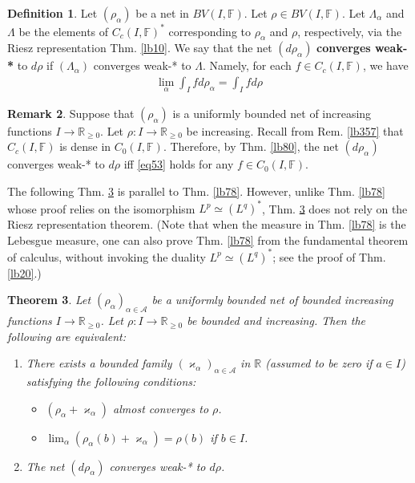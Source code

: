 \documentclass[12pt,b5paper,notitlepage]{article}
\theoremstyle{definition}
\newtheorem{df}{Definition}[subsection]
\newtheorem{rem}[df]{Remark}
\theoremstyle{plain}
\newtheorem{thm}[df]{Theorem}
\newcommand{\scr}{\mathscr}
\newcommand{\Rbb}{\mathbb R}
\newcommand{\Fbb}{\mathbb F}
\numberwithin{equation}{section}
\begin{document}
\begin{df}
Let $(\rho_\alpha)$ be a net in $BV(I,\Fbb)$. Let $\rho\in BV(I,\Fbb)$. Let $\Lambda_\alpha$ and $\Lambda$ be the elements of $C_c(I,\Fbb)^*$ corresponding to $\rho_\alpha$ and $\rho$, respectively, via the Riesz representation Thm. \ref{lb10}.  We say that the net $(d\rho_\alpha)$ \textbf{converges weak-*}  to $d\rho$ if $(\Lambda_\alpha)$ converges weak-* to $\Lambda$. Namely, for each $f\in C_c(I,\Fbb)$, we have
\begin{align}\label{eq53}
\lim_\alpha \int_I f d\rho_\alpha=\int_I fd\rho
\end{align}
\end{df}

\begin{rem}\label{lb186}
Suppose that $(\rho_\alpha)$ is a uniformly bounded net of increasing functions $I\rightarrow\Rbb_{\geq0}$. Let $\rho:I\rightarrow\Rbb_{\geq0}$ be increasing. Recall from Rem. \ref{lb357} that $C_c(I,\Fbb)$ is dense in $C_0(I,\Fbb)$. Therefore, by Thm. \ref{lb80}, the net $(d\rho_\alpha)$ converges weak-* to $d\rho$ iff \eqref{eq53} holds for any $f\in C_0(I,\Fbb)$.
\end{rem}

The following Thm. \ref{lb92} is parallel to Thm. \ref{lb78}. However, unlike Thm. \ref{lb78} whose proof relies on the isomorphism $L^p\simeq(L^q)^*$, Thm. \ref{lb92} does not rely on the Riesz representation theorem. (Note that when the measure in Thm. \ref{lb78} is the Lebesgue measure, one can also prove Thm. \ref{lb78} from the fundamental theorem of calculus, without invoking the duality $L^p\simeq(L^q)^*$; see the proof of Thm. \ref{lb20}.)

\begin{thm}\label{lb92}
Let $(\rho_\alpha)_{\alpha\in\scr A}$ be a uniformly bounded net of bounded increasing functions $I\rightarrow\Rbb_{\geq0}$. Let $\rho:I\rightarrow\Rbb_{\geq0}$ be bounded and increasing. Then the following are equivalent:
\begin{enumerate}[label=(\alph*)]
\item There exists a bounded family $(\varkappa_\alpha)_{\alpha\in\scr A}$ in $\Rbb$ (assumed to be zero if $a\in I$) satisfying the following conditions:
\begin{itemize}
\item $(\rho_\alpha+\varkappa_\alpha)$ almost converges to $\rho$.
\item $\lim_\alpha(\rho_\alpha(b)+\varkappa_\alpha)=\rho(b)$ if $b\in I$.
\end{itemize}
\item The net $(d\rho_\alpha)$ converges weak-* to  $d\rho$.
\end{enumerate}
\end{thm}
\end{document}
